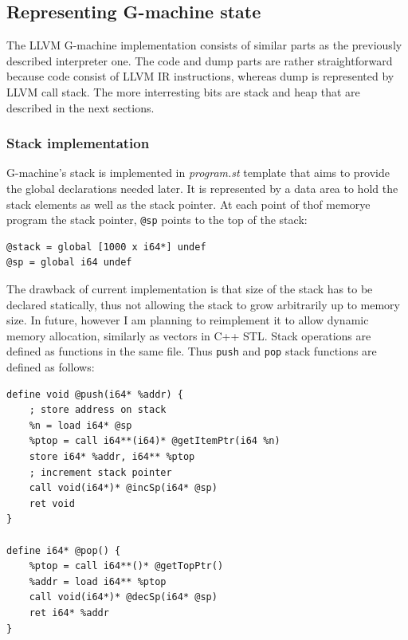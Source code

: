 \documentclass[12pt,a4paper]{report}
\begin{document}
\subsection{Representing G-machine state}
The LLVM G-machine implementation consists of similar parts as the previously
described interpreter one. The code and dump parts are rather straightforward
because code consist of LLVM IR instructions, whereas dump is represented by
LLVM call stack. The more interresting bits are stack and heap that are
described in the next sections.

\subsubsection{Stack implementation}
G-machine's stack is implemented in \textit{program.st}
template that aims to provide the global declarations needed later. It is
represented by a data area to hold the stack elements as well as the stack
pointer. At each point of thof memorye program the stack pointer, \texttt{@sp} points to
the top of the stack:

\vspace*{0.2in}
\begin{lstlisting}[style=assembler]
@stack = global [1000 x i64*] undef
@sp = global i64 undef
\end{lstlisting}

The drawback of current implementation is that size of the stack has to be
declared statically, thus not allowing the stack to grow arbitrarily up to
memory size. In future, however I am planning to reimplement it to allow dynamic
memory allocation, similarly as vectors in C++ STL. Stack operations are
defined as functions in the same file. Thus \texttt{push} and \texttt{pop}
stack functions are defined as follows:

\vspace*{0.2in}
\begin{lstlisting}[style=assembler,caption={\texttt{push} and \texttt{pop} operations on the
  LLVM stack.}]
define void @push(i64* %addr) {
    ; store address on stack
    %n = load i64* @sp
    %ptop = call i64**(i64)* @getItemPtr(i64 %n)
    store i64* %addr, i64** %ptop
    ; increment stack pointer
    call void(i64*)* @incSp(i64* @sp)
    ret void
}

define i64* @pop() {
    %ptop = call i64**()* @getTopPtr()
    %addr = load i64** %ptop
    call void(i64*)* @decSp(i64* @sp)
    ret i64* %addr
}
\end{lstlisting}
\end{document}

